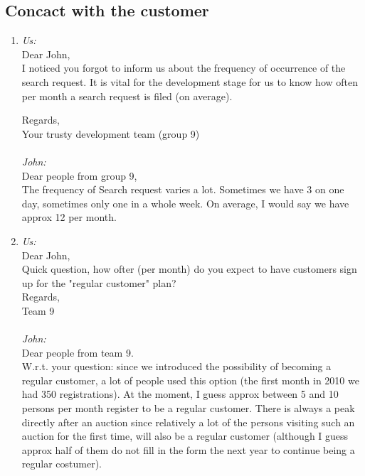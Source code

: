 \subsection*{Concact with the customer}
\begin{enumerate}[1.]
	\item \label{conv1}\textsl{Us:}\\
	Dear John,\\

I noticed you forgot to inform us about the frequency of occurrence of the search request. It is vital for the development stage for us to know how often per month a search request is filed (on average).

Regards,\\
Your trusty development team (group 9)\\
\vspace{10pt}\\
\textsl{John:}\\
Dear people from group 9,\\

The frequency of Search request varies a lot. Sometimes we have 3 on one day, sometimes only one in a whole week. On average, I would say we have approx 12 per month.

\item \label{conv2}\textsl{Us:}\\
Dear John,\\

Quick question, how ofter (per month) do you expect to have customers sign up for the "regular customer" plan?\\

Regards,\\
Team 9\\
\vspace{10pt}\\
\textsl{John:}\\
Dear people from team 9.\\

W.r.t. your question: since we introduced the possibility of becoming a regular customer, a lot of people used this option (the first month in 2010 we had 350 registrations). At the moment, I guess approx between 5  and 10 persons per month register to be a regular customer. There is always a peak directly after an auction since relatively a lot of the persons visiting such an auction for the first time, will also be a regular customer (although I guess approx half of them do not fill in the form the next year to continue being a regular costumer).


\end{enumerate}